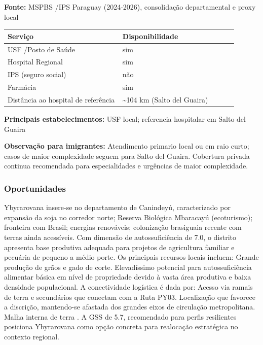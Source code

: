 \textbf{Fonte:} MSPBS /\allowbreak  IPS Paraguay (2024-2026), consolidação
departamental e proxy local

{\def\LTcaptype{none} %
\begin{longtable}{@{}>{\raggedright\arraybackslash}p{0.45\linewidth} >{\raggedright\arraybackslash}p{0.45\linewidth}@{}}
\toprule\noalign{}
Serviço & Disponibilidade \\
\midrule\noalign{}
\endhead
\bottomrule\noalign{}
\endlastfoot
USF /\allowbreak  Posto de Saúde & sim \\
Hospital Regional & sim \\
IPS (seguro social) & não \\
Farmácia & sim \\
Distância ao hospital de referência & \textasciitilde104 km (Salto del
Guaira) \\
\end{longtable}
}

\textbf{Principais estabelecimentos:} USF local; referencia hospitalar
em Salto del Guaira

\textbf{Observação para imigrantes:} Atendimento primario local ou em
raio curto; casos de maior complexidade seguem para Salto del Guaira.
Cobertura privada continua recomendada para especialidades e urgências
de maior complexidade.
\newpage

\subsubsection*{Oportunidades}\label{oport-ybyrarovana-1412}
Ybyrarovana insere-se no departamento de Canindeyú, caracterizado por expansão da soja no corredor norte; Reserva Biológica Mbaracayú (ecoturismo); fronteira com Brasil; energias renováveis; colonização brasiguaia recente com terras ainda acessíveis. Com dimensão de autossuficiência de 7.0, o distrito apresenta base produtiva adequada para projetos de agricultura familiar e pecuária de pequeno a médio porte. Os principais recursos locais incluem: Grande produção de grãos e gado de corte. Elevadíssimo potencial para autossuficiência alimentar básica em nível de propriedade devido à vasta área produtiva e baixa densidade populacional. A conectividade logística é dada por: Acesso via ramais de terra e secundários que conectam com a Ruta PY03. Localização que favorece a discrição, mantendo-se afastada dos grandes eixos de circulação metropolitana. Malha interna de terra . A GSS de 5.7, recomendado para perfis resilientes posiciona Ybyrarovana como opção concreta para realocação estratégica no contexto regional.


